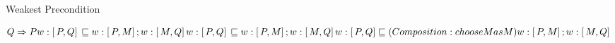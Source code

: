 

\newcommand\specstate[3]{#1:[\,#2, #3]\,}
\newcommand\composition[4]{\specstate{#1}{#2}{#3} \fine \specstate{#1}{#2}{#4}; \specstate{#1}{#4}{#3}}

\newcommand\compproof[4]{\specstate{#1}{#2}{#3}\\
						 \fine (Composition: choose M as #4)\\
						 \specstate{#1}{#2}{#4}; \specstate{#1}{#4}{#3}}

\begin{topic}{Weakest Precondition}

$$
Q \implies P\\

w:[\,P, Q]\, \fine w:[\,P, M]\,; w:[\,M, Q]\,

\composition{w}{P}{Q}{M}

\compproof{w}{P}{Q}{M}
$$

\end{topic}